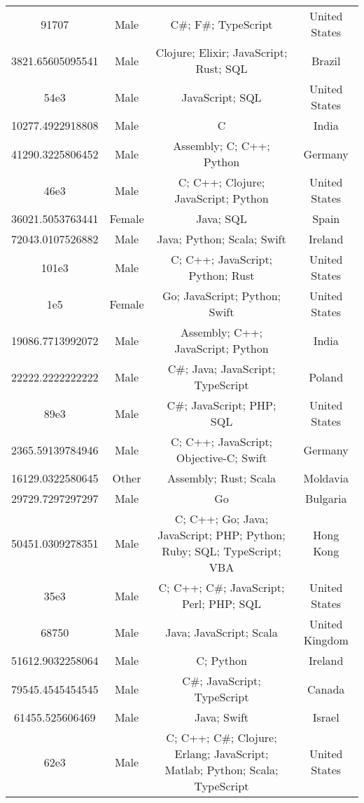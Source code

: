 \begin{center}
\begin{tabular}{ |c|c|c|c| }
91707  &  Male  &  C\#; F\#; TypeScript  &  United States  \\ 
3821.65605095541  &  Male  &  Clojure; Elixir; JavaScript; Rust; SQL  &  Brazil  \\ 
54e3  &  Male  &  JavaScript; SQL  &  United States  \\ 
10277.4922918808  &  Male  &  C  &  India  \\ 
41290.3225806452  &  Male  &  Assembly; C; C++; Python  &  Germany  \\ 
46e3  &  Male  &  C; C++; Clojure; JavaScript; Python  &  United States  \\ 
36021.5053763441  &  Female  &  Java; SQL  &  Spain  \\ 
72043.0107526882  &  Male  &  Java; Python; Scala; Swift  &  Ireland  \\ 
101e3  &  Male  &  C; C++; JavaScript; Python; Rust  &  United States  \\ 
1e5  &  Female  &  Go; JavaScript; Python; Swift  &  United States  \\ 
19086.7713992072  &  Male  &  Assembly; C++; JavaScript; Python  &  India  \\ 
22222.2222222222  &  Male  &  C\#; Java; JavaScript; TypeScript  &  Poland  \\ 
89e3  &  Male  &  C\#; JavaScript; PHP; SQL  &  United States  \\ 
2365.59139784946  &  Male  &  C; C++; JavaScript; Objective-C; Swift  &  Germany  \\ 
16129.0322580645  &  Other  &  Assembly; Rust; Scala  &  Moldavia  \\ 
29729.7297297297  &  Male  &  Go  &  Bulgaria  \\ 
50451.0309278351  &  Male  &  C; C++; Go; Java; JavaScript; PHP; Python; Ruby; SQL; TypeScript; VBA  &  Hong Kong  \\ 
35e3  &  Male  &  C; C++; C\#; JavaScript; Perl; PHP; SQL  &  United States  \\ 
68750  &  Male  &  Java; JavaScript; Scala  &  United Kingdom  \\ 
51612.9032258064  &  Male  &  C; Python  &  Ireland  \\ 
79545.4545454545  &  Male  &  C\#; JavaScript; TypeScript  &  Canada  \\ 
61455.525606469  &  Male  &  Java; Swift  &  Israel  \\ 
62e3  &  Male  &  C; C++; C\#; Clojure; Erlang; JavaScript; Matlab; Python; Scala; TypeScript  &  United States  \\ 

\end{tabular}
\end{center}
